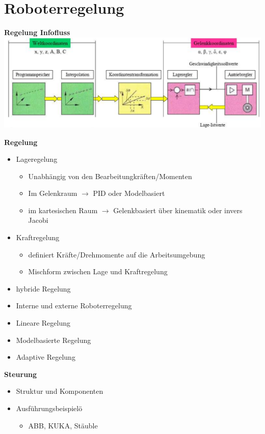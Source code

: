 \section{Roboterregelung }
\textbf{Regelung Infofluss}\newline
\includegraphics[width=\linewidth]{./bilder/RegelungInfofluss}

\begin{minipage}[t]{0.5\linewidth}
    \textbf{Regelung}
    \begin{itemize}
        \item Lageregelung
        \begin{itemize}
            \item Unabhängig von den Bearbeitungkräften/Momenten
            \item Im Gelenkraum $\rightarrow$ PID oder Modelbasiert
            \item im kartesischen Raum $\rightarrow$ Gelenkbasiert über kinematik oder invers Jacobi
        \end{itemize}
        \item Kraftregelung
        \begin{itemize}
            \item definiert Kräfte/Drehmomente auf die Arbeitsumgebung
        \end{itemize}
        \begin{itemize}
            \item Mischform zwischen Lage und Kraftregelung
        \end{itemize}
        \item hybride Regelung
        \item Interne und externe Roboterregelung
        \item Lineare Regelung
        \item Modelbasierte Regelung
        \item Adaptive Regelung
    \end{itemize}
\end{minipage}
\begin{minipage}[t]{0.5\linewidth}
    \textbf{Steurung}
    \begin{itemize}
        \item Struktur und Komponenten
        \item Ausführungsbeispielö
        \begin{itemize}
            \item ABB, KUKA, Stäuble
        \end{itemize}
    \end{itemize}
\end{minipage}

